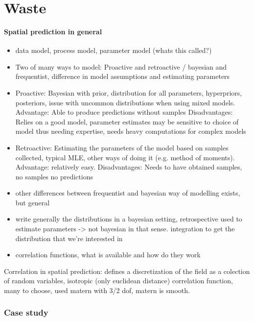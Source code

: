 \part{Waste}
\subsection{Spatial prediction in general}
\begin{itemize}
\item data model, process model,  parameter model (whats this called?)
\item Two of many ways to model: Proactive and retroactive / bayesian and frequentist, difference in model assumptions and estimating parameters 

\item Proactive: Bayesian with prior, distribution for all parameters, hyperpriors, posteriors, issue with uncommon distributions when using mixed models. Advantage: Able to produce predictions without samples Disadvantages: Relies on a good model, parameter estimates may be sensitive to choice of model thus needing expertise, needs heavy computations for complex models

\item Retroactive: Estimating the parameters of the model based on samples collected, typical MLE, other ways of doing it (e.g. method of moments). Advantage: relatively easy. Disadvantages: Needs to have obtained samples, no samples no predictions

\item other differences between frequentist and bayesian way of modelling exists, but general

\item write generally the distributions in a bayesian setting, retrospective used to estimate parameters -> not bayesian in that sense. integration to get the distribution that we're interested in

\item correlation functions, what is available and how do they work
\end{itemize}
Correlation in spatial prediction:
defines a discretization of the field as a colection of random variables, isotropic (only euclidean distance) correlation function, many to choose, used matern with 3/2 dof, matern is smooth. 

\section{Case study}
